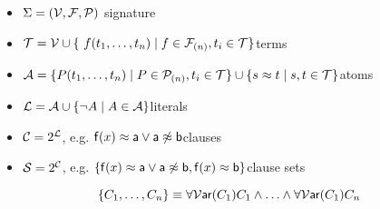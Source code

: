 \begin{notation}
\begin{itemize}
\item $\Sigma = ({\mathcal V}, {\mathcal F}, {\mathcal P})$ \hfill signature
\item $\SIGT = \SIGV \cup \{ f(t_1,\ldots,t_n)\mid f\in\SIGF_{(n)}, t_i \in \SIGT \}$\hfill terms
\item ${\mathcal A} = \{ P ( t_1, \ldots, t_n )\mid P\in{\mathcal P}_{(n)}, t_i \in {\mathcal T}\}
\cup
\{ s \approx t \mid s,t\in {\mathcal T}\}$\hfill  atoms
%	
\item ${\mathcal L} = {\mathcal A} \cup \{ \lnot A \mid A\in {\mathcal A} \}$\hfill literals
\item ${\mathcal C} = 2^{\mathcal L}$, e.g. ${\mathsf f}(x)\approx{\mathsf a} \lor {\mathsf a}\not\approx{\mathsf b}$\hfill clauses
\item ${\mathcal S} = 2^{\mathcal C}$, e.g. $\{ {\mathsf f}(x)\approx{\mathsf a} \lor {\mathsf a}\not\approx{\mathsf b}, {\mathsf f}(x)\approx{\mathsf b}\}$\hfill clause sets
\end{itemize}




\end{notation}

\[
\{ C_1, \ldots, C_n \} \equiv 
\forall{}{\mathcal V}\mathsf{ar}(C_1) C_1 
\land \ldots \land
\forall{}{\mathcal V}\mathsf{ar}(C_1) C_n 
\]
